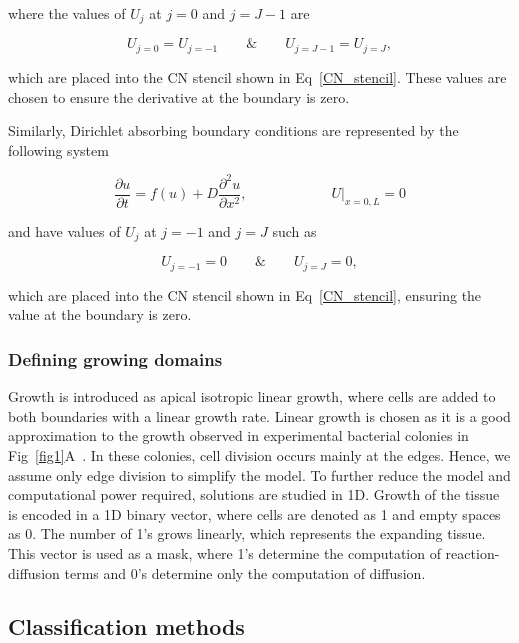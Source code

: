 \documentclass[10pt,letterpaper]{article}
\newcommand{\pdvn}[3]{\frac{\partial^{#1} {#2}}{\partial {#3}^{#1}}}
\begin{document}
where the values of $U_{j}$ at $j=0$ and $j=J-1$ are

\begin{equation}
    U_{j=0} = U_{j=-1}  \quad \quad \&  \quad \quad  U_{j=J-1} = U_{j=J},
\end{equation}

which are placed into the CN stencil shown in Eq~\ref{CN_stencil}.
These values are chosen to ensure the derivative at the boundary is zero.

Similarly, Dirichlet absorbing boundary conditions are represented by the following system

\begin{equation}
    \frac{\partial u}{\partial t} =  f(u) + D\pdvn{2}{u}{x},   \quad \quad \quad \quad \quad \quad U\biggr\rvert_{x=0,L}=0
\end{equation}

and have values of $U_{j}$ at $j=-1$ and $j=J$ such as

\begin{equation}
    U_{j=-1} = 0  \quad \quad \&  \quad \quad  U_{j=J} = 0,
\end{equation}

which are placed into the CN stencil shown in Eq~\ref{CN_stencil},
ensuring the value at the boundary is zero.


\subsubsection*{Defining growing domains}
Growth is introduced as apical isotropic linear growth, where cells are added to both boundaries with a linear growth rate.
Linear growth is chosen as it is a good approximation to the growth observed in experimental bacterial colonies in Fig~\ref{fig1}A~\cite{Oliver2023}.
In these colonies, cell division occurs mainly at the edges. Hence, we assume only edge division to simplify the model.
To further reduce the model and computational power required, solutions are studied in 1D.
Growth of the tissue is encoded in a 1D binary vector, where cells are denoted as 1 and empty spaces as 0.
The number of 1's grows linearly, which represents the expanding tissue.
This vector is used as a mask, where 1's determine the computation of reaction-diffusion terms and 0's determine only the computation of diffusion.


\subsection*{Classification methods}\label{classification}
\end{document}
